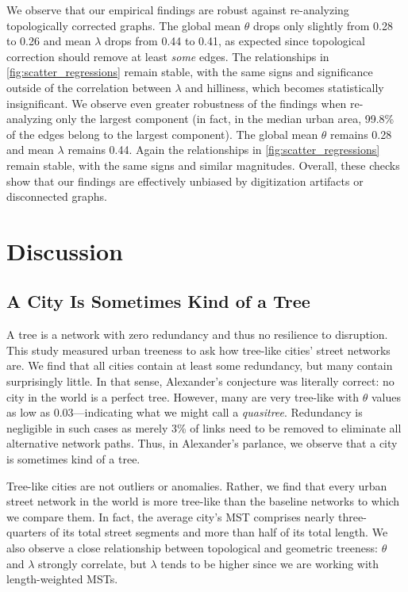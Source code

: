 \documentclass[12pt,letterpaper]{article} %
\begin{document}
We observe that our empirical findings are robust against re-analyzing topologically corrected graphs. The global mean $\theta$ drops only slightly from 0.28 to 0.26 and mean $\lambda$ drops from 0.44 to 0.41, as expected since topological correction should remove at least \textit{some} edges. The relationships in \autoref{fig:scatter_regressions} remain stable, with the same signs and significance outside of the correlation between $\lambda$ and hilliness, which becomes statistically insignificant. We observe even greater robustness of the findings when re-analyzing only the largest component (in fact, in the median urban area, 99.8\% of the edges belong to the largest component). The global mean $\theta$ remains 0.28 and mean $\lambda$ remains 0.44. Again the relationships in \autoref{fig:scatter_regressions} remain stable, with the same signs and similar magnitudes. Overall, these checks show that our findings are effectively unbiased by digitization artifacts or disconnected graphs.

\section{Discussion}

\subsection{A City Is Sometimes Kind of a Tree}

A tree is a network with zero redundancy and thus no resilience to disruption. This study measured urban treeness to ask how tree-like cities' street networks are. We find that all cities contain at least some redundancy, but many contain surprisingly little. In that sense, Alexander's conjecture was literally correct: no city in the world is a perfect tree. However, many are very tree-like with $\theta$ values as low as 0.03---indicating what we might call a \textit{quasitree}. Redundancy is negligible in such cases as merely 3\% of links need to be removed to eliminate all alternative network paths. Thus, in Alexander's parlance, we observe that a city is sometimes kind of a tree.

Tree-like cities are not outliers or anomalies. Rather, we find that every urban street network in the world is more tree-like than the baseline networks to which we compare them. In fact, the average city's MST comprises nearly three-quarters of its total street segments and more than half of its total length. We also observe a close relationship between topological and geometric treeness: $\theta$ and $\lambda$ strongly correlate, but $\lambda$ tends to be higher since we are working with length-weighted MSTs.
\end{document}
